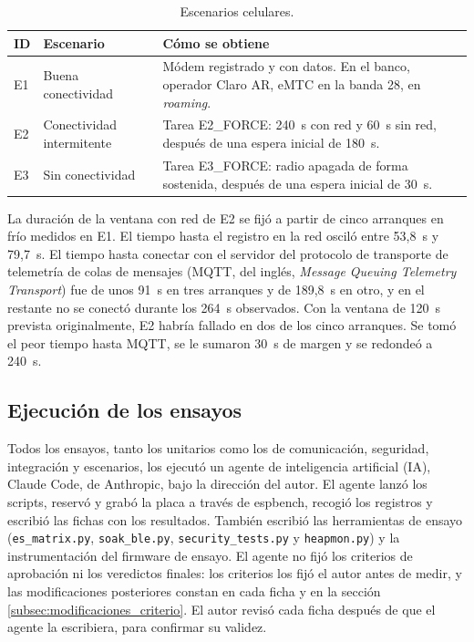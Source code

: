 \begin{table}[htbp]
\centering
\caption{Escenarios celulares.}
\label{tab:escenarios}
\small
\begin{tabular}{L{0.07\textwidth} L{0.25\textwidth} L{0.58\textwidth}}
\toprule
\textbf{ID} & \textbf{Escenario} & \textbf{Cómo se obtiene} \\
\midrule
E1 & Buena conectividad & Módem registrado y con datos. En el banco, operador Claro AR, eMTC en la banda 28, en \textit{roaming}. \\
E2 & Conectividad intermitente & Tarea E2\_FORCE: 240~s con red y 60~s sin red, después de una espera inicial de 180~s. \\
E3 & Sin conectividad & Tarea E3\_FORCE: radio apagada de forma sostenida, después de una espera inicial de 30~s. \\
\bottomrule
\end{tabular}
\end{table}

La duración de la ventana con red de E2 se fijó a partir de cinco arranques en frío medidos en E1. El tiempo hasta el registro en la red osciló entre 53,8~s y 79,7~s. El tiempo hasta conectar con el servidor del protocolo de transporte de telemetría de colas de mensajes (MQTT, del inglés, \textit{Message Queuing Telemetry Transport}) fue de unos 91~s en tres arranques y de 189,8~s en otro, y en el restante no se conectó durante los 264~s observados. Con la ventana de 120~s prevista originalmente, E2 habría fallado en dos de los cinco arranques. Se tomó el peor tiempo hasta MQTT, se le sumaron 30~s de margen y se redondeó a 240~s.

\subsection{Ejecución de los ensayos}
\label{subsec:ejecucion_ensayos}

Todos los ensayos, tanto los unitarios como los de comunicación, seguridad, integración y escenarios, los ejecutó un agente de inteligencia artificial (IA), Claude Code, de Anthropic, bajo la dirección del autor. El agente lanzó los scripts, reservó y grabó la placa a través de espbench, recogió los registros y escribió las fichas con los resultados. También escribió las herramientas de ensayo (\texttt{es\_matrix.py}, \texttt{soak\_ble.py}, \texttt{security\_tests.py} y \texttt{heapmon.py}) y la instrumentación del firmware de ensayo. El agente no fijó los criterios de aprobación ni los veredictos finales: los criterios los fijó el autor antes de medir, y las modificaciones posteriores constan en cada ficha y en la sección \ref{subsec:modificaciones_criterio}. El autor revisó cada ficha después de que el agente la escribiera, para confirmar su validez.

